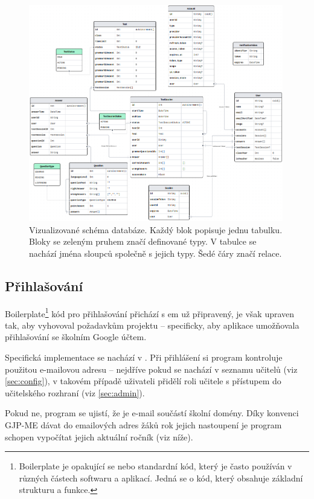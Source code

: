 \begin{figure}[H]
    \centering
    \includegraphics[width=420px]{images/02technologie/schema3.png}
    \caption{Vizualizované schéma databáze. \newline Každý blok popisuje jednu tabulku. Bloky se zeleným pruhem značí definované typy. V tabulce se nachází jména sloupců společně s jejich typy. Šedé čáry značí relace.}
    \label{schema}
\end{figure}


\subsection{Přihlašování}
\label{sec:login}

Boilerplate\footnote{Boilerplate je opakující se nebo standardní kód, který je často používán v různých částech softwaru a aplikací. Jedná se o kód, který obsahuje základní strukturu a funkce.} kód pro přihlašování přichází s em už připravený, je však upraven tak, aby vyhovoval požadavkům projektu -- specificky, aby aplikace umožňovala přihlašování se školním Google účtem.

Specifická implementace se nachází v . \newline Při přihlášení si program kontroluje použitou e-mailovou adresu -- nejdříve pokud se nachází v seznamu učitelů (viz \ref{sec:config}), v takovém případě uživateli přidělí roli učitele s přístupem do učitelského rozhraní (viz \ref{sec:admin}). 

Pokud ne, program se ujistí, že je e-mail součástí školní domény. Díky konvenci GJP-ME dávat do emailových adres žáků rok jejich nastoupení je program schopen vypočítat jejich aktuální ročník (viz níže).

